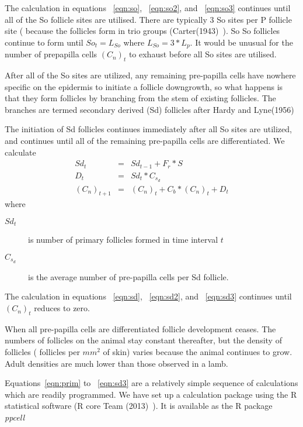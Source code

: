 \documentclass[titlepage]{article}  %
\begin{document}
The calculation in equations ~\ref{eqn:so}, ~\ref{eqn:so2}, and ~\ref{eqn:so3} continues until all of the So follicle sites are utilised. There are typically 3 So sites per P follicle site ( because the follicles form in trio groups (Carter(1943)~\cite{cart:43}). So So follicles continue to form until $ So_{t} = L_{So} $  where $L_{So} = 3 * L_{p} $. It would be unusual for the number of prepapilla cells $(C_{n})_{t}$ to exhaust before all So sites are utilised. 

After all of the So sites are utilized, any remaining pre-papilla cells have nowhere specific on the epidermis to initiate a follicle downgrowth, so what happens is that they form follicles by branching from the stem of existing follicles. The branches are termed secondary derived (Sd) follicles after Hardy and Lyne(1956)~\cite{hard:56}

The initiation of Sd follicles continues immediately after all So sites are utilized, and continues until all of the remaining pre-papilla cells are differentiated. We calculate
\begin{eqnarray}
\label{eqn:sd}
Sd_{t} & = & Sd_{t-1} +  F_{r} * S \\
\label{eqn:sd2}
D_{t} & = & Sd_{t} * C_{s_{d}} \\
\label{eqn:sd3}
(C_{n})_{t+1} & = & (C_{n})_{t} + C_{b} * (C_{n})_{t} + D_{t}
\end{eqnarray}
where
\begin{description}
\item[$Sd_{t}$] is number of primary follicles formed in time interval $t$
\item[$C_{s_{d}}$] is the average number of pre-papilla cells per Sd follicle.
\end{description}
 
The calculation in equations ~\ref{eqn:sd}, ~\ref{eqn:sd2}, and ~\ref{eqn:sd3} continues until $(C_{n})_{t}$ reduces to zero.

When all pre-papilla cells are differentiated follicle development ceases. The numbers of follicles on the animal stay constant thereafter, but the density of follicles ( follicles per $mm^{2}$ of skin) varies because the animal continues to grow.  Adult densities are much lower than those observed in a lamb.

Equations~\ref{eqn:prim} to ~\ref{eqn:sd3} are a relatively simple sequence of calculations which are readily programmed. We have set up a calculation package using the R statistical software (R core Team (2013)~\cite{rprog:13}). It is available as the R package {\em ppcell}~\cite{jack:18} 
\end{document}
